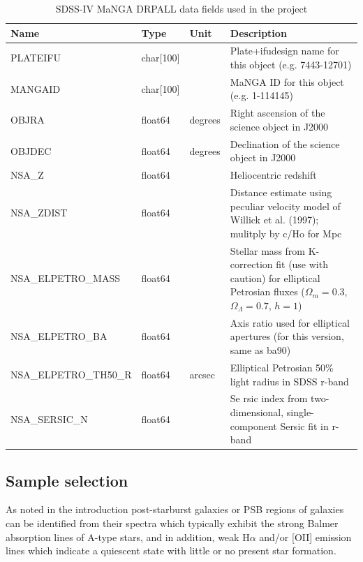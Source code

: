 \begin{table}
\caption[MaNGA DRPALL fields used in the project]{SDSS-IV MaNGA DRPALL data fields used in the project}
\label{tab:DRPall-table}
\begin{tabular}{|p{3.2cm}|p{1.2cm}||p{1cm}|p{10cm}|}
\hline
Name & Type & Unit & Description \\
\hline
PLATEIFU & char{[}100{]} &  & Plate+ifudesign name for this object (e.g. 7443-12701)\\
MANGAID & char{[}100{]} & & MaNGA ID for this object (e.g. 1-114145)\\
OBJRA & float64 & degrees & Right ascension of the science object in J2000\\
OBJDEC & float64 & degrees & Declination of the science object in J2000\\
NSA\_Z & float64 &  & Heliocentric redshift\\
NSA\_ZDIST & float64 &  & Distance estimate using peculiar velocity model of Willick et al. (1997); mulitply by c/Ho for Mpc\\
NSA\_ELPETRO\_MASS & float64 &  & Stellar mass from K-correction fit (use with caution) for elliptical Petrosian fluxes ($\Omega_m=0.3$, $\Omega_\Lambda=0.7$, $h=1$)\\
NSA\_ELPETRO\_BA & float64 &  & Axis ratio used for elliptical apertures (for this version, same as ba90)\\
NSA\_ELPETRO\_TH50\_R & float64 & arcsec & Elliptical Petrosian 50\% light radius in SDSS r-band\\
NSA\_SERSIC\_N & float64 &  & Se
rsic index from two-dimensional, single-component Sersic fit in r-band\\
\hline
\end{tabular}
\end{table}

\subsection{Sample selection}
As noted in the introduction post-starburst galaxies or PSB regions of galaxies can be identified from their spectra which typically exhibit the strong Balmer absorption lines of A-type stars, and in addition, weak H$\alpha$ and/or [OII] emission lines which indicate a quiescent state with little or no present star formation. 

